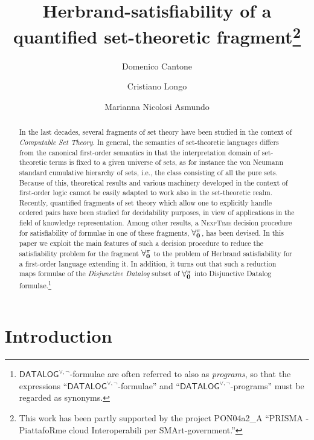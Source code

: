 \documentclass[a4paper]{llncs}
\title{Herbrand-satisfiability of a quantified set-theoretic 
fragment\thanks{This work has been partly supported by the project
PON04a2\_A ``PRISMA - Piat\-tafoRme cloud Interoperabili per 
SMArt-government.''}}
\author{Domenico Cantone \and Cristiano Longo \and Marianna Nicolosi Asmundo}
\institute{Dipartimento di Matematica e Informatica, Universit\`a di 
Catania, Italy\\
\email{\{cantone, longo, nicolosi\}@dmi.unict.it}}
\newcommand{\DisjDatalog}{\ensuremath{\mathsf{DATALOG}^{\vee,\neg}}\xspace}
\begin{document}

\maketitle

\begin{abstract}
In the last decades, several fragments of set theory have been
studied  in the context of \emph{Computable
Set Theory}.
%
In general, the semantics of set-theoretic languages
differs from the canonical first-order semantics in that
the interpretation domain of set-theoretic terms is
fixed to a given universe of sets, as for instance
the von Neumann standard cumulative hierarchy of
sets, i.e., the class consisting of all the pure sets.
Because of this, theoretical results and various
machinery developed in the context of first-order logic
cannot be easily adapted to work also in the set-theoretic
realm.
%
Recently, quantified fragments of set theory
which allow one to explicitly handle ordered pairs have been
studied for decidability purposes, in view of applications in the 
field of knowledge
representation. Among other results, a \textsc{NexpTime}
decision procedure for satisfiability of formulae
in one of these fragments, $\mathbf{\forall_{0}^{\pi}}$, has been
devised.
%
In this paper we exploit the main features of such a decision
procedure to reduce the satisfiability problem for the fragment
$\mathbf{\forall_{0}^{\pi}}$ to the problem of Herbrand satisfiability for a
first-order language extending it.  In addition, it turns out that
such a reduction maps formulae of the \emph{Disjunctive Datalog} subset
of $\mathbf{\forall_{0}^{\pi}}$ into Disjunctive Datalog formulae.\footnote{$\DisjDatalog$-formulae are often referred to
also as \emph{programs}, so that the expressions
``\DisjDatalog-formulae'' and ``\DisjDatalog-programs'' must be
regarded as synonyms.}
\end{abstract}

\section{Introduction}\label{INTRO}
\end{document}
